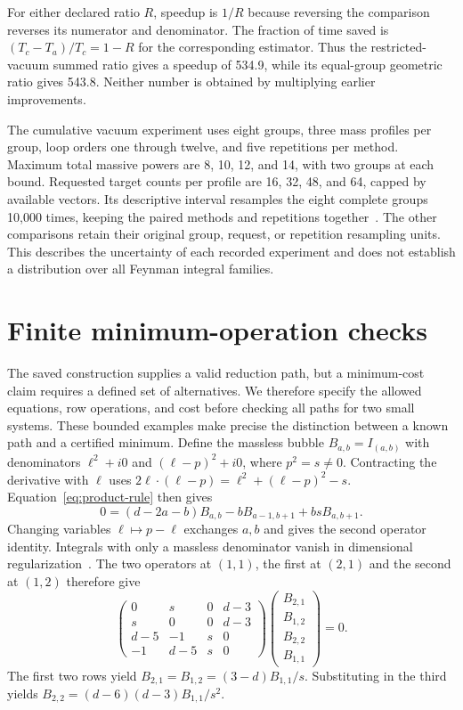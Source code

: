 For either declared ratio $R$, speedup is $1/R$ because reversing the comparison reverses its numerator and denominator. The fraction of time saved is $(T_c-T_a)/T_c=1-R$ for the corresponding estimator. Thus the restricted-vacuum summed ratio gives a speedup of 534.9, while its equal-group geometric ratio gives 543.8. Neither number is obtained by multiplying earlier improvements.

The cumulative vacuum experiment uses eight groups, three mass profiles per group, loop orders one through twelve, and five repetitions per method. Maximum total massive powers are 8, 10, 12, and 14, with two groups at each bound. Requested target counts per profile are 16, 32, 48, and 64, capped by available vectors. Its descriptive interval resamples the eight complete groups 10,000 times, keeping the paired methods and repetitions together~\cite{Efron1979}. The other comparisons retain their original group, request, or repetition resampling units. This describes the uncertainty of each recorded experiment and does not establish a distribution over all Feynman integral families.


\section{Finite minimum-operation checks}
\label{app:project-optimal}
The saved construction supplies a valid reduction path, but a minimum-cost claim requires a defined set of alternatives. We therefore specify the allowed equations, row operations, and cost before checking all paths for two small systems. These bounded examples make precise the distinction between a known path and a certified minimum. Define the massless bubble $B_{a,b}=I_{(a,b)}$ with denominators $\ell^2+i0$ and $(\ell-p)^2+i0$, where $p^2=s\ne0$. Contracting the derivative with $\ell$ uses $2\ell\cdot(\ell-p)=\ell^2+(\ell-p)^2-s$. Equation~\eqref{eq:product-rule} then gives
\begin{equation}
 0=(d-2a-b)B_{a,b}-bB_{a-1,b+1}+bsB_{a,b+1}.
\end{equation}
Changing variables $\ell\mapsto p-\ell$ exchanges $a,b$ and gives the second operator identity. Integrals with only a massless denominator vanish in dimensional regularization~\cite{Weinzierl2022}. The two operators at $(1,1)$, the first at $(2,1)$ and the second at $(1,2)$ therefore give
\begin{equation}
 \begin{pmatrix}0&s&0&d-3\\s&0&0&d-3\\d-5&-1&s&0\\-1&d-5&s&0\end{pmatrix}
 \begin{pmatrix}B_{2,1}\\B_{1,2}\\B_{2,2}\\B_{1,1}\end{pmatrix}=0.
\end{equation}
The first two rows yield $B_{2,1}=B_{1,2}=(3-d)B_{1,1}/s$. Substituting in the third yields $B_{2,2}=(d-6)(d-3)B_{1,1}/s^2$.

